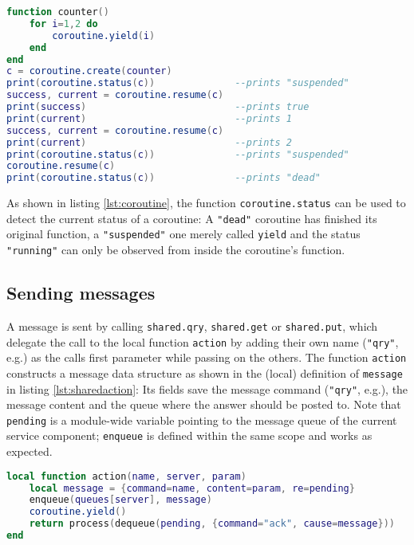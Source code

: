\begin{lstlisting}[language=lua, caption={Using coroutines.}, label=lst:coroutine, name=lst:coroutine]
function counter()
	for i=1,2 do
		coroutine.yield(i)
	end
end
c = coroutine.create(counter)
print(coroutine.status(c))              --prints "suspended"
success, current = coroutine.resume(c)
print(success)                          --prints true
print(current)                          --prints 1
success, current = coroutine.resume(c)
print(current)                          --prints 2
print(coroutine.status(c))              --prints "suspended"
coroutine.resume(c)
print(coroutine.status(c))              --prints "dead"
\end{lstlisting}

As shown in listing \ref{lst:coroutine}, the function \texttt{coroutine.status} can be used to detect the current status of a coroutine: A \texttt{"dead"} coroutine has finished its original function, a \texttt{"suspended"} one merely called \texttt{yield} and the status \texttt{"running"} can only be observed from inside the coroutine's function.

\subsection{Sending messages}
\label{sec:messaging:sending}

A message is sent by calling \texttt{shared.qry}, \texttt{shared.get} or \texttt{shared.put}, which delegate the call to the local function \texttt{action} by adding their own name (\texttt{"qry"}, e.g.) as the calls first parameter while passing on the others. The function \texttt{action} constructs a message data structure as shown in the (local) definition of \texttt{message} in listing \ref{lst:sharedaction}: Its fields save the message command (\texttt{"qry"}, e.g.), the message content and the queue where the answer should be posted to. Note that \texttt{pending} is a module-wide variable pointing to the message queue of the current service component; \texttt{enqueue} is defined within the same scope and works as expected.

\begin{lstlisting}[language=lua, caption={The local function \texttt{action} of the module \texttt{shared}}, label=lst:sharedaction, name=lst:sharedaction]
local function action(name, server, param)
	local message = {command=name, content=param, re=pending}
	enqueue(queues[server], message)
	coroutine.yield()
	return process(dequeue(pending, {command="ack", cause=message}))
end
\end{lstlisting}

